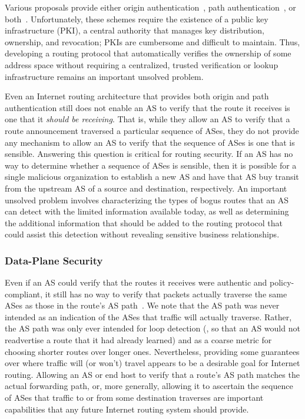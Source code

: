 Various proposals provide either origin authentication~\cite{id-sobgp},
path authentication~\cite{Hu2004:spv}, or both~\cite{kent2000b}.
Unfortunately, these schemes require the existence of a public
key infrastructure (PKI), a central authority that manages key
distribution, ownership, and revocation; PKIs are cumbersome and
difficult to 
maintain.  Thus, developing a routing protocol that automatically
verifies the ownership of some address space without requiring a
centralized, trusted verification or lookup infrastructure remains an
important unsolved problem.

Even an Internet routing architecture that provides both origin and path
authentication still does not enable an AS to verify that the route it
receives is one that it {\em should be receiving}.  That is, while they
allow an AS to verify that a route announcement traversed a particular
sequence of ASes, they do not provide any mechanism to allow an AS to
verify that the sequence of ASes is one that is sensible.  Answering
this question is critical for routing security.  If an AS has no way to
determine whether a sequence of ASes is sensible, then it is possible
for a single malicious organization to establish a new AS and have that
AS buy transit from the upstream AS of a source and destination,
respectively.  An important unsolved problem involves characterizing the
types of bogus routes that an AS can detect with the limited information
available today, as well as determining the additional information that
should be added to the routing protocol that could assist this detection
without 
revealing sensitive business relationships.


\subsubsection{Data-Plane Security}

Even if an AS could verify that the routes it receives were authentic
and policy-compliant, it still has no way to verify that packets
actually traverse the same ASes as those in the route's AS
path~\cite{Mao2003}.  We note that the AS path was never intended as an
indication of the ASes that traffic will actually traverse.  Rather, the
AS path was only
ever intended for loop detection (\ie, so that an AS would not
readvertise a route that it had already learned) and as a coarse metric
for choosing shorter routes over longer ones.  Nevertheless, providing
some guarantees over where traffic will (or won't) travel appears to be
a desirable goal for Internet routing.  Allowing an AS or end host to
verify that a route's AS path matches the actual forwarding path, or,
more generally, allowing it to ascertain the sequence of ASes that
traffic to or from some destination traverses are important capabilities
that any future Internet routing system should provide.  

